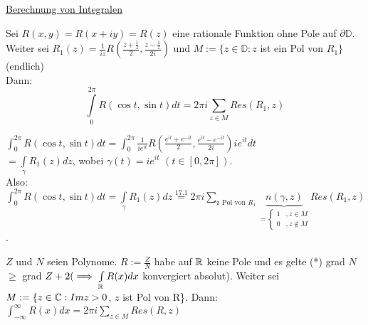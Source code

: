 \documentclass[a4paper,twoside,DIV15,BCOR12mm]{scrbook}
\def\wegint{\ensuremath{\int\limits_\gamma}}
\def\iint{\ensuremath{\int\limits}}
\begin{document}
\underline{Berechnung von Integralen}
\begin{satz}
  Sei $R(x,y)= R(x+iy) = R(z)$ eine rationale Funktion ohne Pole auf $\partial\mathbb{D}$. Weiter sei 
  $R_1(z)=\frac{1}{iz}R(\frac{z+\frac{1}{z}}{2},\frac{z-\frac{1}{z}}{2i})$ und $M:=\{z\in\mathbb{D}:z$ ist ein Pol von $R_1\}$ (endlich)\\
  Dann:
  $$ \int\limits_0^{2\pi}R(\cos{t},\sin{t})dt=2\pi i \sum\limits_{z\in M} Res(R_1,z)$$
\end{satz}
\begin{beweis}

  $\iint_0^{2\pi}R(\cos{t},\sin{t})dt = \iint_0^{2\pi}\frac{1}{ie^{it}} R(\frac{e^{it}+e^{-it}}{2},\frac{e^{it}-e^{-it}}{2i}) ie^{it}dt$\\
  $= \wegint R_1(z)dz$, wobei $\gamma(t)=ie^{it}$ $(t\in[0,2\pi])$.\\
  Also: $\iint_0^{2\pi}R(\cos{t},\sin{t})dt = \wegint R_1(z)dz \stackrel{17.1}{=}2\pi i \sum\limits_{\text{z Pol von $R_1$}} \underbrace{n(\gamma, z)}_{
    =
     \begin{cases} 
       1 & , z \in M \\ 
       0 & ,z \not\in M
     \end{cases}
  }  Res(R_1,z)$.
\end{beweis}
\begin{satz}
  $Z$ und $N$ seien Polynome. $R:=\frac{Z}{N}$ habe auf $\mathbb{R}$ keine Pole und es gelte (*) grad $N$ $\ge$ grad $Z+2 (\folgt \iint_\MdR R(x)dx$ konvergiert absolut). 
  Weiter sei $M:=\{z\in\mathbb{C}: Im z >0$, $z$ ist Pol von R\}. Dann:\\
  $\iint_{-\infty}^\infty R(x) dx = 2\pi i \sum\limits_{z\in M} Res(R,z)$
\end{satz}
\end{document}

